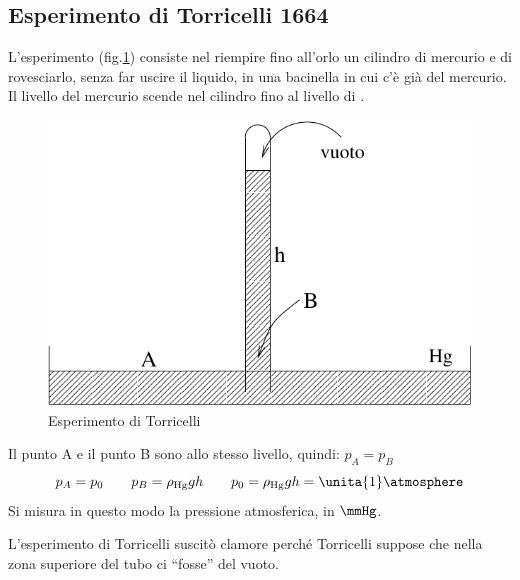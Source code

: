 \subsection{Esperimento di Torricelli 1664}
L'esperimento (fig.\@\ref{estor}) consiste nel riempire fino all'orlo un cilindro di mercurio e di rovesciarlo, senza far uscire il liquido, in una bacinella in cui c'è già del mercurio. Il livello del mercurio scende nel cilindro fino al livello di \meter.
\begin{figure}[htbp]
\centering
\includegraphics[scale=0.7]{immagini/fisica1/Torricelli}
\caption{Esperimento di Torricelli}
\label{estor}
\end{figure}

Il punto A e il punto B sono allo stesso livello, quindi: $p_A=p_B$
$$p_A=p_0\qquad p_B=\rho_{\mathrm{Hg}}gh\qquad p_0=\rho_\mathrm{Hg}gh=\unita{1}\atmosphere$$
Si misura in questo modo la pressione atmosferica, in $\mmHg$.

L'esperimento di Torricelli suscitò clamore perché Torricelli suppose che nella zona superiore del tubo ci ``fosse'' del vuoto.

